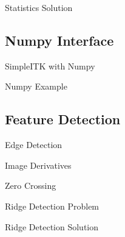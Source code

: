 \begin{frame}{Statistics Solution}
\end{frame}


%
%

\subsection{Numpy Interface}
\begin{frame}{SimpleITK with Numpy}
\end{frame}

\begin{frame}{Numpy Example}
\end{frame}


\subsection{Feature Detection}
\begin{frame}{Edge Detection}
\end{frame}

\begin{frame}{Image Derivatives}
\end{frame}

\begin{frame}{Zero Crossing}
\end{frame}


\begin{frame}{Ridge Detection Problem}
\end{frame}

\begin{frame}{Ridge Detection Solution}
\end{frame}




